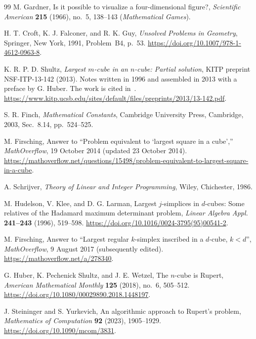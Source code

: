 \documentclass[11pt]{article}
\numberwithin{equation}{section}
\theoremstyle{definition}
\theoremstyle{definition}
\begin{document}
\medskip
\begin{thebibliography}{99}
M. Gardner,
Is it possible to visualize a four-dimensional figure?,
\emph{Scientific American} \textbf{215} (1966), no.~5, 138--143
(\emph{Mathematical Games}).

H. T. Croft, K. J. Falconer, and R. K. Guy,
\emph{Unsolved Problems in Geometry},
Springer, New York, 1991, Problem~B4, p.~53.
\url{https://doi.org/10.1007/978-1-4612-0963-8}.

K. R. P. D. Shultz,
\emph{Largest $m$-cube in an $n$-cube: Partial solution},
KITP preprint NSF-ITP-13-142 (2013).
Notes written in 1996 and assembled in 2013 with a preface by G. Huber.
The work is cited in~\cite{HSW2018}.
\url{https://www.kitp.ucsb.edu/sites/default/files/preprints/2013/13-142.pdf}.

S. R. Finch,
\emph{Mathematical Constants},
Cambridge University Press, Cambridge, 2003, Sec.~8.14, pp.~524--525.

M. Firsching,
Answer to ``Problem equivalent to `largest square in a cube',''
\emph{MathOverflow}, 19 October 2014 (updated 23 October 2014).
\url{https://mathoverflow.net/questions/15498/problem-equivalent-to-largest-square-in-a-cube}.

A. Schrijver,
\emph{Theory of Linear and Integer Programming},
Wiley, Chichester, 1986.

M. Hudelson, V. Klee, and D. G. Larman,
Largest $j$-simplices in $d$-cubes: Some relatives of the Hadamard
maximum determinant problem,
\emph{Linear Algebra Appl.} \textbf{241--243} (1996), 519--598.
\url{https://doi.org/10.1016/0024-3795(95)00541-2}.

M. Firsching,
Answer to ``Largest regular $k$-simplex inscribed in a $d$-cube,
$k<d$'',
\emph{MathOverflow}, 9 August 2017 (subsequently edited).
\url{https://mathoverflow.net/a/278340}.

G. Huber, K. Pechenick Shultz, and J. E. Wetzel,
The $n$-cube is Rupert,
\emph{American Mathematical Monthly} \textbf{125} (2018), no.~6, 505--512.
\url{https://doi.org/10.1080/00029890.2018.1448197}.

J. Steininger and S. Yurkevich,
An algorithmic approach to Rupert's problem,
\emph{Mathematics of Computation} \textbf{92} (2023), 1905--1929.
\url{https://doi.org/10.1090/mcom/3831}.

\end{thebibliography}
\end{document}
